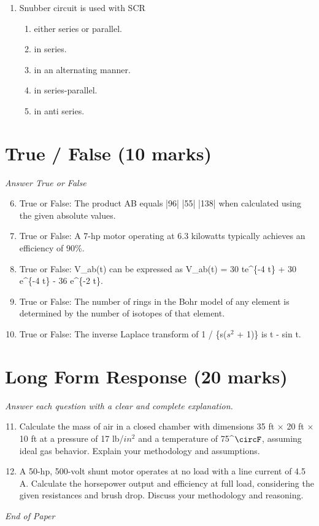 \documentclass[12pt]{article}
\begin{document}
\begin{enumerate}[label=\arabic*.]
\begin{enumerate}[label=(\alph*)]
    \item 100 $meter^2$
    \item 50 $meter^2$
    \item 40 $meter^2$
    \item 16 $meter^2$
\end{enumerate}
\item Snubber circuit is used with SCR
\begin{enumerate}[label=(\alph*)]
    \item either series or parallel.
    \item in series.
    \item in an alternating manner.
    \item in series-parallel.
    \item in anti series.
\end{enumerate}
\end{enumerate}

\section*{True / False (10 marks)}
\textit{Answer True or False}
\begin{enumerate}[label=\arabic*.]
\setcounter{enumi}{5}
\item True or False: The product AB equals |96| |55| |138| when calculated using the given absolute values.
\item True or False: A 7-hp motor operating at 6.3 kilowatts typically achieves an efficiency of 90\%.
\item True or False: V\_ab(t) can be expressed as V\_ab(t) = 30 te^\{-4 t\} + 30 e^\{-4 t\} - 36 e^\{-2 t\}.
\item True or False: The number of rings in the Bohr model of any element is determined by the number of isotopes of that element.
\item True or False: The inverse Laplace transform of 1 / \{s($s^2$ + 1)\} is t - sin t.
\end{enumerate}

\section*{Long Form Response (20 marks)}
\textit{Answer each question with a clear and complete explanation.}
\begin{enumerate}[label=\arabic*.]
\setcounter{enumi}{10}
\item Calculate the mass of air in a closed chamber with dimensions 35 ft \ensuremath{\times} 20 ft \ensuremath{\times} 10 ft at a pressure of 17 lb/$in^2$ and a temperature of 75^\ensuremath{\circF}, assuming ideal gas behavior. Explain your methodology and assumptions.
\item A 50-hp, 500-volt shunt motor operates at no load with a line current of 4.5 A. Calculate the horsepower output and efficiency at full load, considering the given resistances and brush drop. Discuss your methodology and reasoning.
\end{enumerate}

\vfill
\noindent\textit{End of Paper}
\end{document}
